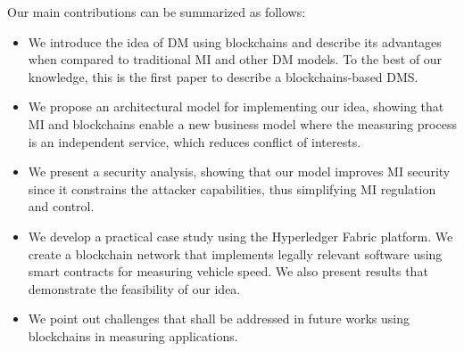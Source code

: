 \documentclass[journal]{IEEEtran}
\begin{document}

Our main contributions can be summarized as follows:
\begin{itemize}
 \item We introduce the idea of DM using blockchains and describe its advantages when compared to traditional MI and other DM models. To the best of our knowledge, this is the first paper to describe a blockchains-based DMS.
 \item We propose an architectural model for implementing our idea, showing that MI and blockchains enable a new business model where the measuring process is an independent service, which reduces conflict of interests.
 \item We present a security analysis, showing that our model improves MI security since it constrains the attacker capabilities, thus simplifying MI regulation and control.
 \item We develop a practical case study using the Hyperledger Fabric \cite{Androulaki2018} platform. We create a blockchain network that implements legally relevant software using smart contracts for measuring vehicle speed. We also present results that demonstrate the feasibility of our idea.
 \item We point out challenges that shall be addressed in future works using blockchains in measuring applications.
\end{itemize}

\end{document}
